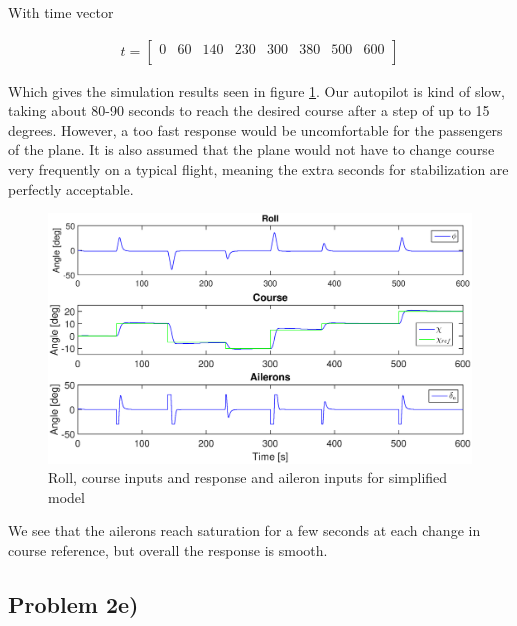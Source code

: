 With time vector

\begin{align}
    t = 
    \begin{bmatrix}
    0 & 60 & 140 & 230 & 300 & 380 & 500 & 600 \\
    \end{bmatrix}
\end{align}

Which gives the simulation results seen in figure \ref{fig:response_2d}. Our autopilot is kind of slow, taking about 80-90 seconds to reach the desired course after a step of up to 15 degrees. However, a too fast response would be uncomfortable for the passengers of the plane. It is also assumed that the plane would not have to change course very frequently on a typical flight, meaning the extra seconds for stabilization are perfectly acceptable.

\begin{figure}[!h]
    \centering
    \includegraphics[width=\textwidth]{prob2d.eps}
    \caption{Roll, course inputs and response and aileron inputs for simplified model}
    \label{fig:response_2d}
\end{figure}

We see that the ailerons reach saturation for a few seconds at each change in course reference, but overall the response is smooth.


\subsection*{Problem 2e)}

